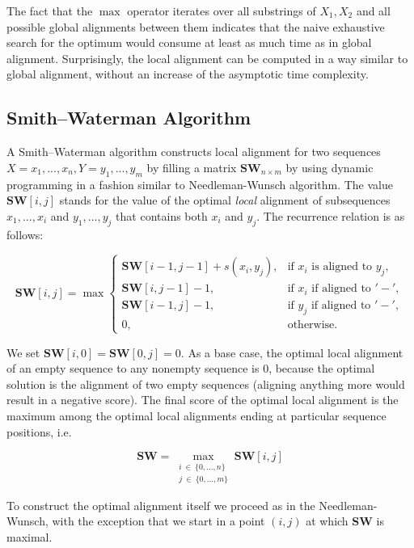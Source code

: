 The fact that the $\max$ operator iterates over all substrings of $X_1, X_2$ and all possible global alignments between them indicates that the naive exhaustive search for the optimum would consume at least as much time as in global alignment. Surprisingly, the local alignment can be computed in a way similar to global alignment, without an increase of the asymptotic time complexity. 

\subsection*{Smith–Waterman Algorithm}
A Smith–Waterman algorithm \cite{SmithWaterman} constructs local alignment for two sequences $X = x_1,...,x_n, Y = y_1,...,y_m$ by filling a matrix $\textbf{SW}_{n \times m}$ by using dynamic programming in a fashion similar to Needleman-Wunsch algorithm. The value $\textbf{SW}[i, j]$ stands for the value of the optimal \textit{local} alignment of subsequences $x_1,...,x_i$ and $y_1,...,y_j$ that contains both $x_i$ and $y_j$. The recurrence relation is as follows:

\begin{equation}
\textbf{SW}[i, j] = \max
\begin{cases}
    \textbf{SW}[i - 1, j - 1] + s(x_i, y_j), & \text{if } x_i \text{ is aligned to } y_j,\\
    \textbf{SW}[i, j - 1] - 1, & \text{if } x_i \text{ if aligned to } '-',\\
    \textbf{SW}[i - 1, j] - 1, & \text{if } y_j \text{ if aligned to } '-',\\
    0, & \text{otherwise}.
\end{cases}
\end{equation}

We set $\textbf{SW}[i, 0] = \textbf{SW}[0, j] = 0$. As a base case, the optimal local alignment of an empty sequence to any nonempty sequence is $0$, because the optimal solution is the alignment of two empty sequences (aligning anything more would result in a negative score). The final score of the optimal local alignment is the maximum among the optimal local alignments ending at particular sequence positions, i.e.

\begin{equation}
\textbf{SW} = \max_{\substack{i ~\in~ \{0, ..., n\} \\ j ~\in~ \{0, ..., m\}}} \textbf{SW}[i, j]
\end{equation}

To construct the optimal alignment itself we proceed as in the Needleman-Wunsch, with the exception that we start in a point $(i, j)$ at which \textbf{SW} is maximal.

